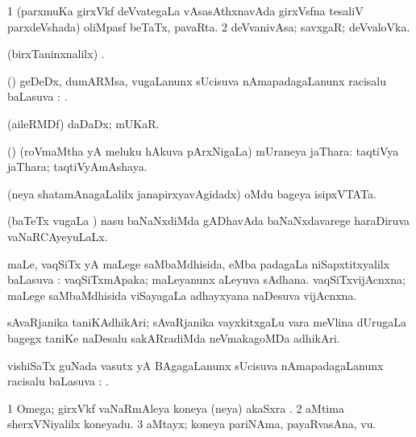 \bentry
{}
\gl{\nA}
\bmng
\bnum
\num{1} (parxmuKa girxVkf deVvategaLa vAsasAthxnavAda girxVsfna tesaliV parxdeVshada) oliMpasf beTaTx, pavaRta. 
\num{2} deVvanivAsa; savxgaR; deVvaloVka. 
\enum
\emng
\eentry

\bentry
{}
\gl{\saMkiSx}
\bmng
(birxTaninxnalilx) . 
\emng
\eentry

\bentry
{}
\gl{\uparx}
\bmng
(\veYshA) geDeDx, dumARMsa, \mo vugaLanunx sUcisuva nAmapadagaLanunx racisalu baLasuva \uparx: . 
\emng
\eentry

\bentry
{}
\gl{\nA}
\bmng
(aileRMDf) daDaDx; mUKaR. 
\emng
\eentry

\bentry
{}
\gl{\nA}
\bmng
(\pArxvi) (roVmaMtha yA meluku hAkuva pArxNigaLa) mUraneya jaThara: taqtiVya jaThara; taqtiVyAmAshaya. 
\emng
\eentry

\bentry
{}
\gl{\nA}
\bmng
(neya shatamAnagaLalilx janapirxyavAgidadx) oMdu bageya isipxVTATa. 
\emng
\eentry

\bentry
{}
\gl{\gu}
\expl{\Sp}
\bmng
(baTeTx \mo vugaLa \vi) nasu baNaNxdiMda gADhavAda baNaNxdavarege haraDiruva vaNaRCAyeyuLaLx. 
\emng
\eentry

\bentry
{}
\gl{\sapUpa}
\bmng
maLe, vaqSiTx yA maLege saMbaMdhisida, eMba padagaLa niSapxtitxyalilx baLasuva \sapUpa:  vaqSiTxmApaka; maLeyanunx aLeyuva sAdhana.  vaqSiTxvijAcnxna; maLege saMbaMdhisida viSayagaLa adhayxyana naDesuva vijAcnxna. 
\emng
\eentry

\bentry
{}
\gl{\nA}
\bmng
sAvaRjanika taniKAdhikAri; sAvaRjanika vayxkitxgaLu \mo vara meVlina dUrugaLa bagegx taniKe naDesalu sakARradiMda neVmakagoMDa adhikAri. 
\emng
\eentry

\bentry
{}
\gl{\uparx}
\bmng
vishiSaTx guNada vasutx yA BAgagaLanunx sUcisuva nAmapadagaLanunx racisalu baLasuva \uparx: . 
\emng
\eentry

\bentry
{}
\gl{\nA}
\bmng
\bnum
\num{1} Omega; girxVkf vaNaRmAleya koneya (neya) akaSxra \eng{$(\Omega, \omega)$}. 
\num{2} aMtima sherxVNiyalilx koneyadu. 
\num{3} aMtayx; koneya pariNAma, payaRvasAna, \mo vu. 
\enum
\emng

